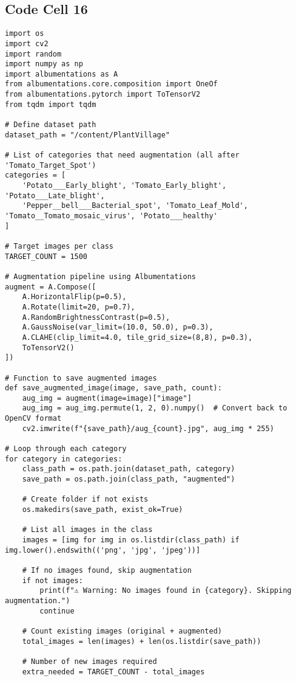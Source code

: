\documentclass{article}
\begin{document}
\subsection*{Code Cell 16}
\begin{lstlisting}
import os
import cv2
import random
import numpy as np
import albumentations as A
from albumentations.core.composition import OneOf
from albumentations.pytorch import ToTensorV2
from tqdm import tqdm

# Define dataset path
dataset_path = "/content/PlantVillage"

# List of categories that need augmentation (all after 'Tomato_Target_Spot')
categories = [
    'Potato___Early_blight', 'Tomato_Early_blight', 'Potato___Late_blight',
    'Pepper__bell___Bacterial_spot', 'Tomato_Leaf_Mold', 'Tomato__Tomato_mosaic_virus', 'Potato___healthy'
]

# Target images per class
TARGET_COUNT = 1500

# Augmentation pipeline using Albumentations
augment = A.Compose([
    A.HorizontalFlip(p=0.5),
    A.Rotate(limit=20, p=0.7),
    A.RandomBrightnessContrast(p=0.5),
    A.GaussNoise(var_limit=(10.0, 50.0), p=0.3),
    A.CLAHE(clip_limit=4.0, tile_grid_size=(8,8), p=0.3),
    ToTensorV2()
])

# Function to save augmented images
def save_augmented_image(image, save_path, count):
    aug_img = augment(image=image)["image"]
    aug_img = aug_img.permute(1, 2, 0).numpy()  # Convert back to OpenCV format
    cv2.imwrite(f"{save_path}/aug_{count}.jpg", aug_img * 255)

# Loop through each category
for category in categories:
    class_path = os.path.join(dataset_path, category)
    save_path = os.path.join(class_path, "augmented")

    # Create folder if not exists
    os.makedirs(save_path, exist_ok=True)

    # List all images in the class
    images = [img for img in os.listdir(class_path) if img.lower().endswith(('png', 'jpg', 'jpeg'))]

    # If no images found, skip augmentation
    if not images:
        print(f"⚠️ Warning: No images found in {category}. Skipping augmentation.")
        continue

    # Count existing images (original + augmented)
    total_images = len(images) + len(os.listdir(save_path))

    # Number of new images required
    extra_needed = TARGET_COUNT - total_images


\end{lstlisting}
\end{document}
